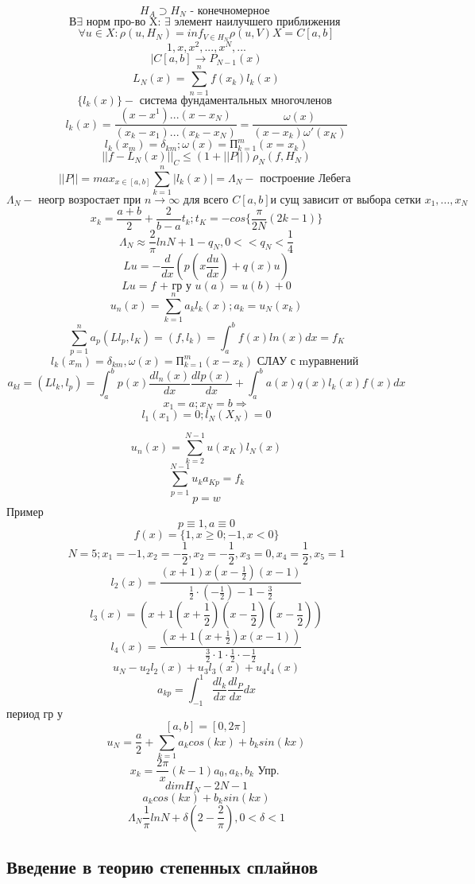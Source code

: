 \documentclass[12pt, a4paper]{article}
\begin{document}
\[ H_A \supset H_N  \textrm{ - конечномерное }\]
\[ В \exists \textrm{ норм про-во X:  } \exists \textrm{ элемент наилучшего приближения }  \]
\[ \forall u \in X: \rho(u, H_N) = {inf}_{V \in H_N} \rho(u, V) X = C[a, b] \]
\[ 1, x, x^2, ..., x^N, ... \]
\[ | C[a, b] \rightarrow P_{N-1} (x) \]
\[ L_N(x) = \sum_{n=1}^{n} f(x_k) l_k(x) \]
\[ \{ l_k(x) \} -\textrm{ система фундаментальных многочленов } \]
\[ l_k(x) = \frac{(x-x^1) ... (x-x_N)}{(x_k-x_1) ... (x_k - x_N)} = \frac{\omega(x)}{(x-x_k) \omega'(x_K)} \]
\[ l_k(x_m) = \delta _{km}; \omega (x) = П_{k=1}^{m} (x = x_k) \]
\[ || f - L_N(x) ||_C \leq (1+||P||)\rho_N (f, H_N) \]
\[ ||P|| = {max}_{x \in [a, b]} \sum_{k=1}^{n} |l_k(x)| = \Lambda_N - \textrm{ построение Лебега }\]
\[ \Lambda_N - \textrm{ неогр возростает при  } n\rightarrow \infty \textrm{ для всего  } C[a,b] \textrm{и сущ зависит от выбора сетки } x_1, ... , x_N\]
\[ x_k = \frac{a+b}{2} + \frac{2}{b-a} t_k; t_K = -cos\{\frac{\pi}{2N}(2k-1)\}  \]
\[ \Lambda_N \approx \frac{2}{\pi} ln N + 1- q_N, 0<< q_N < \frac{1}{4} \]
\[ Lu = -\frac{d}{dx}(p(x \frac{du}{dx}) + q(x) u) \]
\[ Lu = f\textrm{ + гр у } u(a) = u(b) + 0 \]
\[ u_n(x) = \sum_{k=1}^{n} a_k l_k(x); a_k = u_N(x_k) \]
\[ \sum_{p=1}^{n} a_p (Ll_p, l_K) = (f, l_k) = \int_{a}^{b} f(x) ln(x) dx = f_K \]
\[ l_k(x_m) = \delta_{km}, \omega(x) = П^{m}_{k=1} (x- x_k) \textrm{ СЛАУ с mуравнений }\]
\[ a_{kl} = (Ll_k, l_p) = \int_{a}^{b}p(x) \frac{dl_n(x)}{dx} \frac{dlp(x)}{dx} + \int_{a}^{b}a(x) q(x) l_k(x) f(x) dx \]
\[ x_1 = a; x_N = b \Rightarrow \]
\[ l_1(x_1) = 0; l_N (X_N) = 0 \]

\[ u_n(x) = \sum_{k=2}^{N-1}u(x_K) l_N(x) \]
\[ \sum_{p=1}^{N-1}u_k a_{Kp} = f_{k} \]
\[ p = w \]
Пример
\[ p \equiv 1, a \equiv 0 \]
\[ f(x) = \{1, x \geq 0; -1, x<0 \} \]
\[ N=5; x_1=-1, x_2 = -\frac{1}{2}, x_2=-\frac{1}{2}, x_3 = 0, x_4 = \frac{1}{2}, x_5=1 \]
\[ l_2(x) = \frac{(x+1)x(x-\frac{1}{2})(x-1)}{\frac{1}{2}\cdot(-\frac{1}{2}) -1 -\frac{3}{2}} \]
\[ l_3(x) = (x+1(x+\frac{1}{2})(x-\frac{1}{2})(x-\frac{1}{2})) \]
\[ l_4(x)  = \frac{(x+1(x+\frac{1}{2})x(x-1))}{\frac{3}{2} \cdot 1 \cdot \frac{1}{2} \cdot -\frac{1}{2}} \]
\[ u_N - u_2 l_2(x) + u_3l_3(x) + u_4l_4(x) \]
\[ a_{kp} = \int_{-1}^{1} \frac{dl_k}{dx} \frac{dl_P}{dx} dx \]
период гр у
\[ [a, b] = [0, 2 \pi] \]
\[ u_N = \frac{a}{2} + \sum_{k=1}^{} a_k cos(kx) + b_k sin(kx) \]
\[ x_k = \frac{2 \pi}{x}(k-1) a_0, a_k, b_k \textrm{ Упр. } \]
\[ dim H_N - 2N-1 \]
\[ a_k cos(kx)+ b_k sin(kx) \]
\[ \Lambda_N \frac{1}{\pi} ln N + \delta (2-\frac{2}{\pi}), 0 < \delta < 1 \]

\subsection{Введение в теорию степенных сплайнов}
\end{document}
